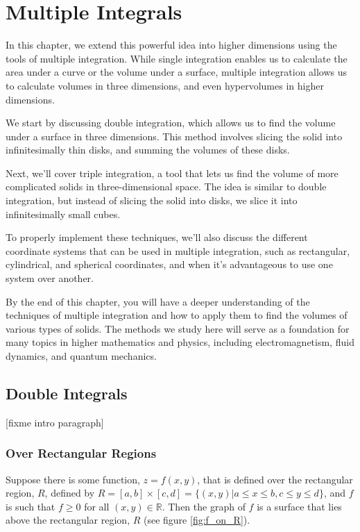 \chapter{Multiple Integrals}


In this chapter, we extend this powerful idea into higher dimensions using the 
tools of multiple integration. While single integration enables us to calculate
the area under a curve or the volume under a surface, multiple integration 
allows us to calculate volumes in three dimensions, and even hypervolumes in 
higher dimensions.

We start by discussing double integration, which allows us to find the volume 
under a surface in three dimensions. This method involves slicing the solid 
into infinitesimally thin disks, and summing the volumes of these disks.

Next, we'll cover triple integration, a tool that lets us find the volume of 
more complicated solids in three-dimensional space. The idea is similar to 
double integration, but instead of slicing the solid into disks, we slice it 
into infinitesimally small cubes.

To properly implement these techniques, we'll also discuss the different 
coordinate systems that can be used in multiple integration, such as 
rectangular, cylindrical, and spherical coordinates, and when it's advantageous
to use one system over another.

By the end of this chapter, you will have a deeper understanding of the 
techniques of multiple integration and how to apply them to find the volumes 
of various types of solids. The methods we study here will serve as a 
foundation for many topics in higher mathematics and physics, including 
electromagnetism, fluid dynamics, and quantum mechanics.

\section{Double Integrals}
[fixme intro paragraph]

\subsection{Over Rectangular Regions}
Suppose there is some function, $z = f(x,y)$, that is defined over the 
rectangular region, $R$, defined by $R = [a, b] \times [c,d] = \{(x,y)| a \leq 
x \leq b, c \leq y \leq d\}$, and $f$ is such that $f \geq 0$ for all $(x, y) 
\in \mathbb{R}$. Then the graph of $f$ is a surface that lies above the 
rectangular region, $R$ (see figure \ref{fig:f_on_R}). 

